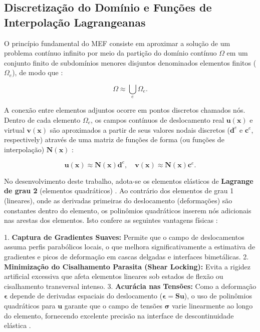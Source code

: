 \subsection{Discretização do Domínio e Funções de Interpolação Lagrangeanas}

O princípio fundamental do MEF consiste em aproximar a solução de um problema contínuo infinito por meio da partição do domínio contínuo $\Omega$ em um conjunto finito de subdomínios menores disjuntos denominados elementos finitos ($\Omega_e$), de modo que \cite{logg2012automated}:

\begin{equation}
    \Omega \approx \bigcup_e \Omega_e.
\end{equation}

A conexão entre elementos adjuntos ocorre em pontos discretos chamados nós. Dentro de cada elemento $\Omega_e$, os campos contínuos de deslocamento real $\mathbf{u}(\mathbf{x})$ e virtual $\mathbf{v}(\mathbf{x})$ são aproximados a partir de seus valores nodais discretos ($\mathbf{d}^e$ e $\mathbf{c}^e$, respectively) através de uma matriz de funções de forma (ou funções de interpolação) $\mathbf{N}(\mathbf{x})$ \cite{logg2012automated}:

\begin{equation}
  \mathbf{u}(\mathbf{x}) \approx \mathbf{N}(\mathbf{x}) \mathbf{d}^e, \quad \mathbf{v}(\mathbf{x}) \approx \mathbf{N}(\mathbf{x}) \mathbf{c}^e.
\end{equation}

  No desenvolvimento deste trabalho, adota-se os elementos elásticos de \textbf{Lagrange de grau 2} (elementos quadráticos) \cite{logg2012automated}. Ao contrário dos elementos de grau 1 (lineares), onde as derivadas primeiras do deslocamento (deformações) são constantes dentro do elemento, os polinômios quadráticos inserem nós adicionais nas arestas dos elementos. Isto confere as seguintes vantagens físicas \cite{logg2012automated}:

1. \textbf{Captura de Gradientes Suaves:} Permite que o campo de deslocamentos assuma perfis parabólicos locais, o que melhora significativamente a estimativa de gradientes e picos de deformação em cascas delgadas e interfaces bimetálicas.
2. \textbf{Minimização do Cisalhamento Parasita (Shear Locking):} Evita a rigidez artificial excessiva que afeta elementos lineares sob estados de flexão ou cisalhamento transversal intenso.
3. \textbf{Acurácia nas Tensões:} Como a deformação $\mathbf{\epsilon}$ depende de derivadas espaciais do deslocamento ($\mathbf{\epsilon} = \mathbf{S} \mathbf{u}$), o uso de polinômios quadráticos para $\mathbf{u}$ garante que o campo de tensões $\mathbf{\sigma}$ varie linearmente ao longo do elemento, fornecendo excelente precisão na interface de descontinuidade elástica \cite{Sadd2009}.

